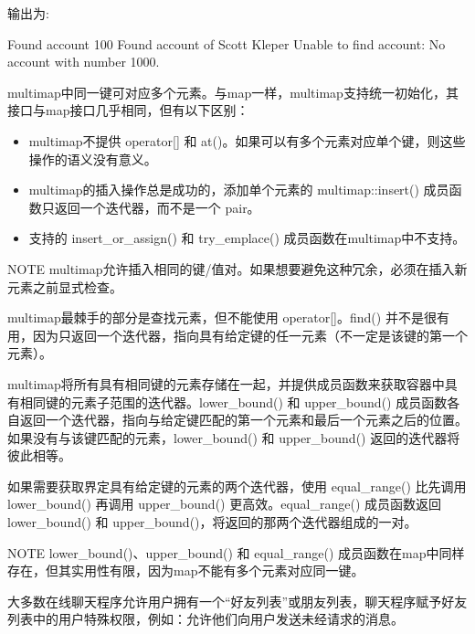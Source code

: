 输出为:

\begin{shell}
Found account 100
Found account of Scott Kleper
Unable to find account: No account with number 1000.
\end{shell}


multimap中同一键可对应多个元素。与map一样，multimap支持统一初始化，其接口与map接口几乎相同，但有以下区别：

\begin{itemize}
\item
multimap不提供 operator[] 和 at()。如果可以有多个元素对应单个键，则这些操作的语义没有意义。

\item
multimap的插入操作总是成功的，添加单个元素的 multimap::insert() 成员函数只返回一个迭代器，而不是一个 pair。

\item
支持的 insert\_or\_assign() 和 try\_emplace() 成员函数在multimap中不支持。
\end{itemize}

\begin{myNotic}{NOTE}
multimap允许插入相同的键/值对。如果想要避免这种冗余，必须在插入新元素之前显式检查。
\end{myNotic}

multimap最棘手的部分是查找元素，但不能使用 operator[]。find() 并不是很有用，因为只返回一个迭代器，指向具有给定键的任一元素（不一定是该键的第一个元素）。

multimap将所有具有相同键的元素存储在一起，并提供成员函数来获取容器中具有相同键的元素子范围的迭代器。lower\_bound() 和 upper\_bound() 成员函数各自返回一个迭代器，指向与给定键匹配的第一个元素和最后一个元素之后的位置。如果没有与该键匹配的元素，lower\_bound() 和 upper\_bound() 返回的迭代器将彼此相等。

如果需要获取界定具有给定键的元素的两个迭代器，使用 equal\_range() 比先调用 lower\_bound() 再调用 upper\_bound() 更高效。equal\_range() 成员函数返回 lower\_bound() 和 upper\_bound()，将返回的那两个迭代器组成的一对。

\begin{myNotic}{NOTE}
lower\_bound()、upper\_bound() 和 equal\_range() 成员函数在map中同样存在，但其实用性有限，因为map不能有多个元素对应同一键。
\end{myNotic}


大多数在线聊天程序允许用户拥有一个“好友列表”或朋友列表，聊天程序赋予好友列表中的用户特殊权限，例如：允许他们向用户发送未经请求的消息。


